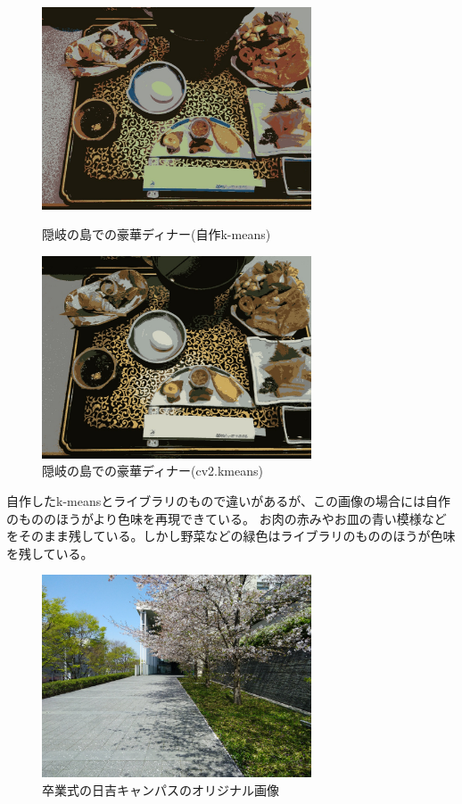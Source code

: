 \documentclass[11pt,a4j]{jsarticle}
\begin{document}
    \begin{figure}[htbp]
        \begin{minipage}{0.5\hsize}
         \begin{center}
          \includegraphics[width=80mm]{img/good_meal_result.jpg}
         \end{center}
         \caption{隠岐の島での豪華ディナー(自作k-means)}
        \end{minipage}
        \begin{minipage}{0.5\hsize}
         \begin{center}
          \includegraphics[width=80mm]{img/good_meal_opencv.jpg}
         \end{center}
         \caption{隠岐の島での豪華ディナー(cv2.kmeans)}
        \end{minipage}
    \end{figure} 
    自作したk-meansとライブラリのもので違いがあるが、この画像の場合には自作のもののほうがより色味を再現できている。
    お肉の赤みやお皿の青い模様などをそのまま残している。しかし野菜などの緑色はライブラリのもののほうが色味を残している。

    \begin{figure}[H]
        \centering
        \includegraphics[clip,width=80mm]{img/sakura.jpg}
        \caption{卒業式の日吉キャンパスのオリジナル画像\label{fig:sakura}}
    \end{figure} 
\end{document}
